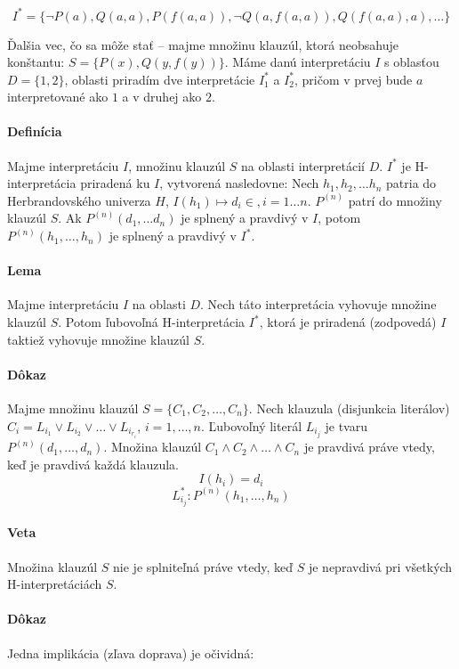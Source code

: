 $$I^* = \{ \neg P(a), Q(a,a), P(f(a,a)), \neg Q(a,f(a,a)), Q(f(a,a),a), \ldots
\}$$

\par
Ďalšia vec, čo sa môže stať -- majme množinu klauzúl, ktorá neobsahuje
konštantu: $S=\{P(x), Q(y,f(y)) \}$. Máme danú interpretáciu $I$ s oblasťou
$D=\{1,2\}$, oblasti priradím dve interpretácie $I_1^*$ a $I_2^*$, pričom v
prvej bude $a$ interpretované ako $1$ a v druhej ako $2$.

\paragraph{Definícia} Majme interpretáciu $I$, množinu klauzúl $S$ na oblasti
interpretácií $D$. $I^*$ je H-interpretácia priradená ku $I$, vytvorená
nasledovne: Nech $h_1, h_2, \ldots h_n$ patria do Herbrandovského univerza $H$,
$I(h_1) \mapsto d_i \in , i=1 \ldots n$. $P^{(n)}$ patrí do množiny klauzúl $S$.
Ak $P^{(n)}(d_1, \ldots d_n)$ je splnený a pravdivý v $I$, potom
$P^{(n)}(h_1,\ldots,h_n)$ je splnený a pravdivý v $I^*$.

\paragraph{Lema} Majme interpretáciu $I$ na oblasti $D$. Nech táto interpretácia
vyhovuje množine klauzúl $S$. Potom ľubovoľná H-interpretácia $I^*$, ktorá je
priradená (zodpovedá) $I$ taktiež vyhovuje množine klauzúl $S$.

\paragraph{Dôkaz} Majme množinu klauzúl $S=\{C_1, C_2, \ldots , C_n\}$. Nech
klauzula (disjunkcia literálov) $C_i = L_{i_1} \lor L_{i_2} \lor \ldots \lor
L_{i_{r_i}}$, $i=1,\ldots,n$. Ľubovoľný literál $L_{i_j}$ je tvaru $P^{(n)}(d_1,
\ldots, d_n)$. Množina klauzúl $C_1 \land C_2 \land \ldots \land C_n$ je
pravdivá práve vtedy, keď je pravdivá každá klauzula.
$$I(h_i) = d_i$$
$$L^*_{i_j}: P^{(n)}(h_1, \ldots, h_n)$$

\paragraph{Veta} Množina klauzúl $S$ nie je splniteľná práve vtedy, keď $S$ je
nepravdivá pri všetkých H-interpretáciách $S$. 

\paragraph{Dôkaz} Jedna implikácia (zľava doprava) je očividná:

